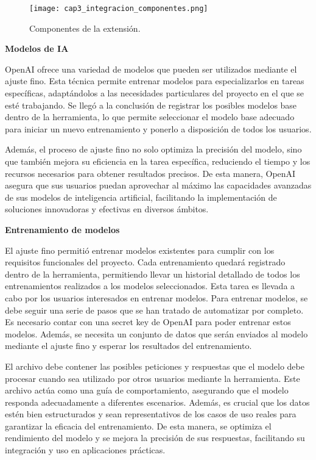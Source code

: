 \begin{figure}[H]  
	\centering
	\texttt{[image: cap3\_integracion\_componentes.png]}
	\caption{Componentes de la extensión.}
	\label{fig:cap3_integracion_componentes}
\end{figure}

\textbf{Modelos de IA}

OpenAI ofrece una variedad de modelos que pueden ser utilizados mediante el ajuste fino. Esta técnica permite entrenar modelos para especializarlos en tareas específicas, adaptándolos a las necesidades particulares del proyecto en el que se esté trabajando. Se llegó a la conclusión de registrar los posibles modelos base dentro de la herramienta, lo que permite seleccionar el modelo base adecuado para iniciar un nuevo entrenamiento y ponerlo a disposición de todos los usuarios.

Además, el proceso de ajuste fino no solo optimiza la precisión del modelo, sino que también mejora su eficiencia en la tarea específica, reduciendo el tiempo y los recursos necesarios para obtener resultados precisos. De esta manera, OpenAI asegura que sus usuarios puedan aprovechar al máximo las capacidades avanzadas de sus modelos de inteligencia artificial, facilitando la implementación de soluciones innovadoras y efectivas en diversos ámbitos.

\textbf{Entrenamiento de modelos}

El ajuste fino permitió entrenar modelos existentes para cumplir con los requisitos funcionales del proyecto. Cada entrenamiento quedará registrado dentro de la herramienta, permitiendo llevar un historial detallado de todos los entrenamientos realizados a los modelos seleccionados. Esta tarea es llevada a cabo por los usuarios interesados en entrenar modelos. Para entrenar modelos, se debe seguir una serie de pasos que se han tratado de automatizar por completo. Es necesario contar con una secret key de OpenAI para poder entrenar estos modelos. Además, se necesita un conjunto de datos que serán enviados al modelo mediante el ajuste fino y esperar los resultados del entrenamiento.

El archivo debe contener las posibles peticiones y respuestas que el modelo debe procesar cuando sea utilizado por otros usuarios mediante la herramienta. Este archivo actúa como una guía de comportamiento, asegurando que el modelo responda adecuadamente a diferentes escenarios. Además, es crucial que los datos estén bien estructurados y sean representativos de los casos de uso reales para garantizar la eficacia del entrenamiento. De esta manera, se optimiza el rendimiento del modelo y se mejora la precisión de sus respuestas, facilitando su integración y uso en aplicaciones prácticas.

